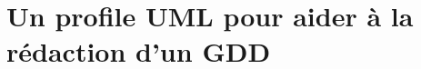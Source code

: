 \chapter{Un profile UML pour aider à la rédaction d'un GDD}


\begin{comment}
\chapter{Un langage de modélisation pour l'établissement d'un Game Design Document}

\section{Le concept}
\subsection{Définition}
\subsubsection{Quoi ?}
Un langage permettant de modéliser et stocker des idées lors des phases de Breakthrough et de Conception d'un projet de jeu vidéo. La modélisation peut être graphique et/ou textuelle avec application des modifications en parallèle. \\
Les informations peuvent contenir tout le nécessaire pour exprimer les idées (textes, informations numériques, chemins de fichiers...). Les champs peuvent être personalisables pour permettre de la souplesse aux utilisateurs.

\subsubsection{Pour quoi faire ?}
\paragraph{Des outils de modélisation existent pour tous les domaines reliés au développement de logiciels. Ils sont souvent spécifiques à un corps de métier afin de pouvoir proposer un maximum de fonctionnalités spécifiques sans devenir trop compliqué et en utilisant un vocabulaire précis qui correspond au corps de métier concerné.}

\paragraph{Il y a peu ou pas de langages de modélisation plus généraux pour des domaines multi-métiers. Le but est de pouvoir modéliser la réflexion créative en fournissant un élément visuel permettant de mind-mapper les idées, les stocker et les réutiliser. \\
Il faut que la modélisation soit assez souple pour pouvoir répondre aux besoins de chacun des corps de métier d'où le fait que les éléments et attributs peuvent avoir des identifiants spécifiques définis librement par l'utilisateur.}


\end{comment}
